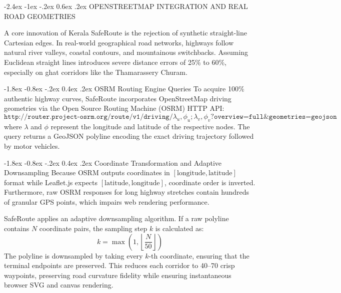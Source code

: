 \documentclass[12pt,oneside]{report}
\makeatletter
\renewcommand{\section}{\@startsection{section}{1}{\z@}%
  {-2.4ex \@plus -1ex \@minus -.2ex}%
  {0.6ex \@plus .2ex}%
  {\normalfont\large\bfseries}}
\renewcommand{\subsection}{\@startsection{subsection}{2}{\z@}%
  {-1.8ex \@plus -0.8ex \@minus -.2ex}%
  {0.4ex \@plus .2ex}%
  {\normalfont\normalsize\bfseries}}
\makeatother
\begin{document}
\section{OPENSTREETMAP INTEGRATION AND REAL ROAD GEOMETRIES}

A core innovation of Kerala SafeRoute is the rejection of synthetic straight-line Cartesian edges. In real-world geographical road networks, highways follow natural river valleys, coastal contours, and mountainous switchbacks. Assuming Euclidean straight lines introduces severe distance errors of 25\% to 60\%, especially on ghat corridors like the Thamarassery Churam.

\subsection{OSRM Routing Engine Queries}
To acquire 100\% authentic highway curves, SafeRoute incorporates OpenStreetMap driving geometries via the Open Source Routing Machine (OSRM) HTTP API:
\begin{equation}
    \texttt{http://router.project-osrm.org/route/v1/driving/} \lambda_u, \phi_u ; \lambda_v, \phi_v \texttt{?overview=full\&geometries=geojson}
\end{equation}
where $\lambda$ and $\phi$ represent the longitude and latitude of the respective nodes. The query returns a GeoJSON polyline encoding the exact driving trajectory followed by motor vehicles.

\subsection{Coordinate Transformation and Adaptive Downsampling}
Because OSRM outputs coordinates in $[\text{longitude}, \text{latitude}]$ format while Leaflet.js expects $[\text{latitude}, \text{longitude}]$, coordinate order is inverted. Furthermore, raw OSRM responses for long highway stretches contain hundreds of granular GPS points, which impairs web rendering performance. 

SafeRoute applies an adaptive downsampling algorithm. If a raw polyline contains $N$ coordinate pairs, the sampling step $k$ is calculated as:
\begin{equation}
    k = \max\left(1, \left\lfloor \frac{N}{50} \right\rfloor\right)
\end{equation}
The polyline is downsampled by taking every $k$-th coordinate, ensuring that the terminal endpoints are preserved. This reduces each corridor to 40--70 crisp waypoints, preserving road curvature fidelity while ensuring instantaneous browser SVG and canvas rendering.
\end{document}

